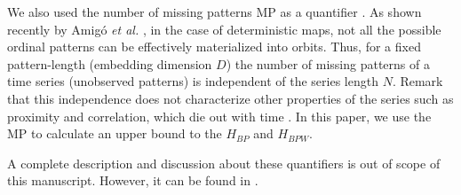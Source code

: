 We also used the number of missing patterns MP as a quantifier \cite{Rosso2012}.
As shown recently by Amig\'o {\it et al.} \cite{Amigo2006,Amigo2007,Amigo2008,Amigo2010}, in the case of deterministic maps, not all the possible ordinal patterns can be effectively materialized into orbits.
Thus, for a fixed pattern-length (embedding dimension $D$) the number of missing patterns of a time series (unobserved patterns) is independent of the series length $N$.
Remark that this independence does not characterize other properties of the series such as proximity and correlation, which die out with time \cite{Amigo2007,Amigo2010}.
In this paper, we use the MP to calculate an upper bound to the $H_{BP}$ and $H_{BPW}$.

A complete description and discussion about these quantifiers is out of scope of this manuscript.
However, it can be found in \cite{DeMicco2014,DeMicco2008,Rosso2010,Rosso2012,Lopez-Ruiz1995,Martin2006,Wackerbauer1994,Antonelli2016}.